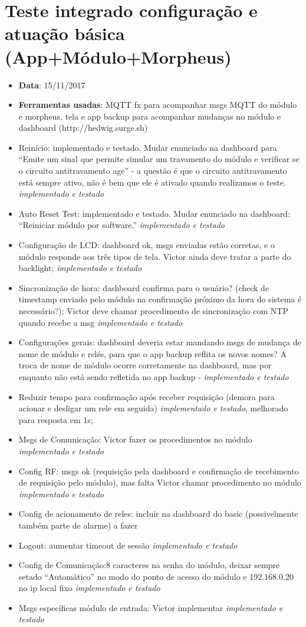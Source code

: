 \chapter{Teste integrado configuração e atuação básica (App+Módulo+Morpheus)}
\label{atttestefimafim}

\begin{itemize}
	\item \textbf{Data}: 15/11/2017
	\item \textbf{Ferramentas usadas}: MQTT fx para acompanhar msgs MQTT do módulo e morpheus, tela e app backup para acompanhar mudanças no módulo e dashboard (http://hedwig.surge.sh)
\item Reinício: implementado e testado. Mudar enunciado na dashboard para “Emite um sinal que permite simular um travamento do módulo e verificar se o circuito antitravamento age” - a questão é que o circuito antitravamento está sempre ativo, não é bem que ele é ativado quando realizamos o teste.  \textit{implementado e testado}
\item Auto Reset Test: implementado e testado. Mudar enunciado na dashboard: “Reiniciar módulo por software.”  \textit{implementado e testado}
\item Configuração de LCD: dashboard ok, msgs enviadas estão corretas, e o módulo responde aos três tipos de tela. Victor ainda deve tratar a parte do backlight;  \textit{implementado e testado}
\item Sincronização de hora: dashboard confirma para o usuário? (check de timestamp enviado pelo módulo na confirmação próximo da hora do sistema é necessário?); Victor deve chamar procedimento de sincronização com NTP quando recebe a msg   \textit{implementado e testado}
\item Configurações gerais: dashboard deveria estar mandando msgs de mudança de nome de módulo e relés, para que o app backup reflita os novos nomes? A troca de nome de módulo ocorre corretamente na dashboard, mas por enquanto não está sendo refletida no app backup -  \textit{implementado e testado}
\item Reduzir tempo para confirmação após receber requisição (demora para acionar e desligar um rele em seguida)  \textit{implementado e testado}, melhorado para resposta em 1s;
\item Msgs de Comunicação: Victor fazer os procedimentos no módulo \textit{implementado e testado}
\item Config RF: msgs ok (requisição pela dashboard e confirmação de recebimento de requisição pelo módulo), mas falta Victor chamar procedimento no módulo \textit{implementado e testado}
\item Config de acionamento de reles: incluir na dashboard do basic (possivelmente também parte de alarme) a fazer
\item Logout: aumentar timeout de sessão \textit{implementado e testado}
\item Config de Comunicação:8 caracteres na senha do módulo, deixar sempre setado “Automático” no modo do ponto de acesso do módulo e 192.168.0.20 no ip local fixo \textit{implementado e testado}
\item Msgs específicas módulo de entrada: Victor implementar \textit{implementado e testado}
\end{itemize}